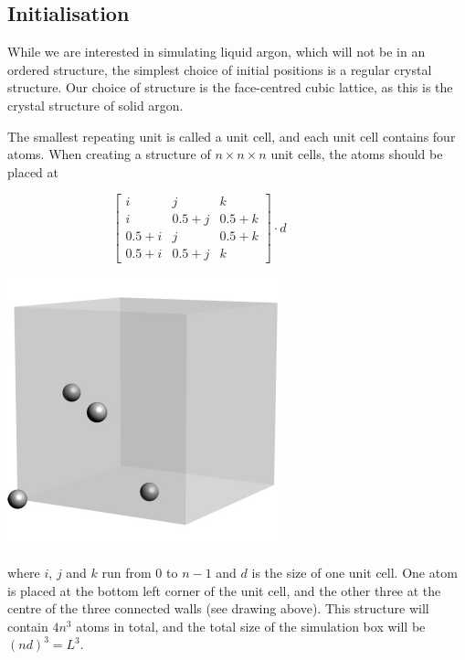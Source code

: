 \documentclass[11pt,english,a4paper]{report}
\begin{document}
\subsection{Initialisation}
While we are interested in simulating liquid argon, which will not be in an ordered structure, the simplest choice of initial positions is a regular crystal structure. Our choice of structure is the face-centred cubic lattice, as this is the crystal structure of solid argon.

The smallest repeating unit is called a unit cell, and each unit cell contains four atoms. When creating a structure of \(n\times n\times n\) unit cells, the atoms should be placed at

\hspace{0.1\textwidth}
\begin{minipage}{0.4\textwidth}
    \centering
    \hfill
    \[
        \begin{bmatrix}
            i & j & k \\
            i & 0.5+j & 0.5+k \\
            0.5+i & j & 0.5+k \\
            0.5+i & 0.5+j & k
        \end{bmatrix}\cdot d\qquad \qquad\qquad
    \]
\end{minipage}
\begin{minipage}{0.4\textwidth}
    \centering
    \includegraphics{fig.pdf}
\end{minipage}

where \(i\), \(j\) and \(k\) run from \(0\) to \(n-1\) and \(d\) is the size of one unit cell. One atom is placed at the bottom left corner of the unit cell, and the other three at
the centre of the three connected walls (see drawing above). This structure will contain \(4n^3\) atoms in total, and the total size of the simulation box will be $(nd)^3=L^3$.
\end{document}
